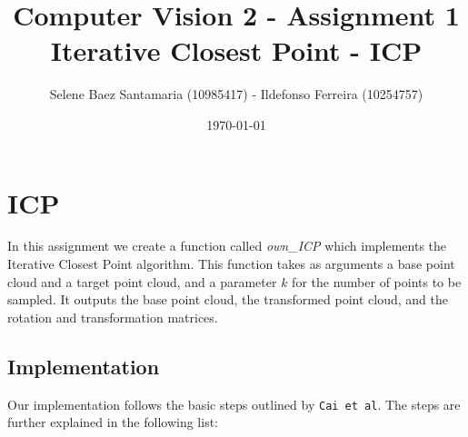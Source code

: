 \documentclass[11pt]{article}
\title{
	{Computer Vision 2 - Assignment 1\\
	 Iterative Closest Point - ICP}
}
\author{
Selene Baez Santamaria (10985417) - Ildefonso Ferreira (10254757)}
\date{\today}
\begin{document}
\maketitle

\section{ICP}
In this assignment we create a function called \textit{own\_ICP} which implements the Iterative Closest Point algorithm. This function takes as arguments a base point cloud and a target point cloud, and a parameter $k$ for the number of points to be sampled. It outputs the base point cloud, the transformed point cloud, and the rotation and transformation matrices.

\subsection{Implementation}
Our implementation follows the basic steps outlined by \texttt{Cai et al}. The steps are further explained in the following list:
\end{document}
